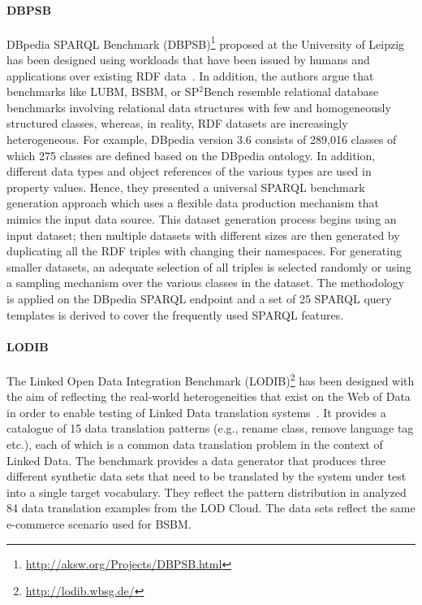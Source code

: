 \paragraph{DBPSB} DBpedia SPARQL Benchmark (DBPSB)\footnote{\url{http://aksw.org/Projects/DBPSB.html}} proposed at the University of Leipzig has been designed using workloads that have been issued by humans and applications over existing RDF data~\cite{Morsey2011,Morsey:2012:UBR:2900929.2901031}. In addition, the authors argue that benchmarks like LUBM, BSBM, or SP$^2$Bench resemble relational database benchmarks involving relational data structures with few and homogeneously structured classes, whereas, in reality, RDF datasets are increasingly heterogeneous. For example, DBpedia version 3.6 consists of 289,016 classes of which 275 classes are defined based on the DBpedia ontology. In addition, different data types and object references of the various types are
used in property values. Hence, they presented a universal SPARQL benchmark generation approach which uses a flexible data production mechanism that mimics the input data source. This dataset generation process begins using an input dataset; then multiple datasets with different sizes  are then generated by duplicating all the RDF triples with changing their namespaces.  For generating smaller datasets, an adequate selection of all triples is selected randomly or using a sampling mechanism over the various classes in the dataset. \iffalse The goal of the query analysis and clustering is to detect prototypical queries on the basis of their frequent usage and similarity.\fi The methodology is applied on the DBpedia SPARQL endpoint and a set of 25 SPARQL query templates is derived to cover the frequently used SPARQL features.

\paragraph{LODIB} The Linked Open Data Integration Benchmark (LODIB)\footnote{\url{http://lodib.wbsg.de/}} has been designed with the aim of reflecting the real-world heterogeneities that exist on the Web of Data in order to enable testing of Linked Data translation systems~\cite{DBLP:conf/www/RiveroSBR12}. It provides a catalogue of 15 data translation patterns (e.g., rename class, remove language tag etc.), each of which is a common data translation problem in the context of Linked Data. The benchmark provides a data generator that produces three different synthetic data sets that need to be translated
by the system under test into a single target vocabulary. They  reflect the pattern distribution in analyzed 84 data translation examples from the LOD Cloud. The data sets reflect the same e-commerce scenario used for BSBM.




